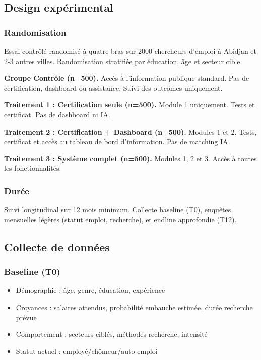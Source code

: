 \documentclass[12pt]{article}
\begin{document}
\subsection{Design expérimental}

\subsubsection{Randomisation}

Essai contrôlé randomisé à quatre bras sur 2000 chercheurs d'emploi à Abidjan et 2-3 autres villes. Randomisation stratifiée par éducation, âge et secteur cible.

\textbf{Groupe Contrôle (n=500).} Accès à l'information publique standard. Pas de certification, dashboard ou assistance. Suivi des outcomes uniquement.

\textbf{Traitement 1 : Certification seule (n=500).} Module 1 uniquement. Tests et certificat. Pas de dashboard ni IA.

\textbf{Traitement 2 : Certification + Dashboard (n=500).} Modules 1 et 2. Tests, certificat et accès au tableau de bord d'information. Pas de matching IA.

\textbf{Traitement 3 : Système complet (n=500).} Modules 1, 2 et 3. Accès à toutes les fonctionnalités.

\subsubsection{Durée}

Suivi longitudinal sur 12 mois minimum. Collecte baseline (T0), enquêtes mensuelles légères (statut emploi, recherche), et endline approfondie (T12).

\subsection{Collecte de données}

\subsubsection{Baseline (T0)}

\begin{itemize}
    \item Démographie : âge, genre, éducation, expérience
    \item Croyances : salaires attendus, probabilité embauche estimée, durée recherche prévue
    \item Comportement : secteurs ciblés, méthodes recherche, intensité
    \item Statut actuel : employé/chômeur/auto-emploi
\end{itemize}
\end{document}
